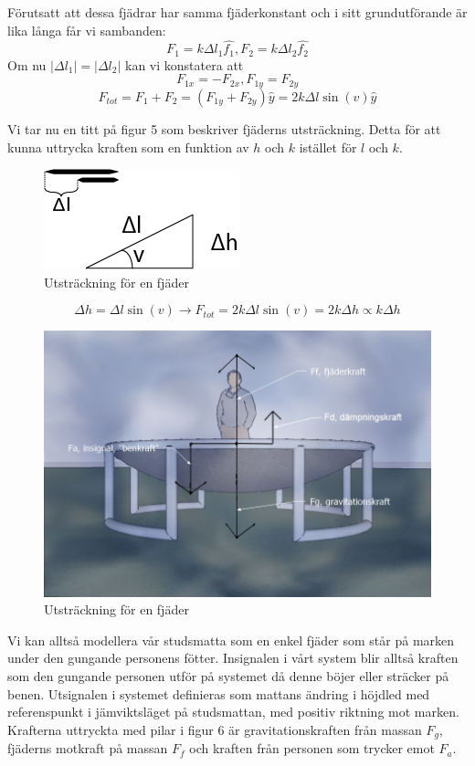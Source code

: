 \documentclass[10pt,a4paper]{article}
\begin{document}
Förutsatt att dessa fjädrar har samma fjäderkonstant och i sitt grundutförande är lika långa får vi sambanden:
$$F_1=k\Delta l_1\hat{f_1}, F_2=k\Delta l_2\hat{f_2}$$
Om nu $|\Delta l_1|=|\Delta l_2|$ kan vi konstatera att
$$F_{1x}=-F_{2x}, F_{1y}=F_{2y}$$
$$F_{tot}=F_1+F_2=(F_{1y}+F_{2y})\hat{y}=2k\Delta l\sin(v)\hat{y}$$

\pagebreak
Vi tar nu en titt på figur 5 som beskriver fjäderns utsträckning. Detta för att kunna uttrycka kraften som en funktion av $h$ och $k$ istället för $l$ och $k$.

\begin{figure}[ht]
\begin{center}
\includegraphics[scale=0.5]{utstrackning}
\caption{Utsträckning för en fjäder}
\end{center}
\end{figure}

$$\Delta h = \Delta l \sin(v) \rightarrow F_{tot}=2k\Delta l \sin(v)=2k\Delta h\propto k\Delta h $$

\begin{figure}[ht]
\begin{center}
\includegraphics[scale=0.5]{BildKrafterMedDampning}
\caption{Utsträckning för en fjäder}
\end{center}
\end{figure}

Vi kan alltså modellera vår studsmatta som en enkel fjäder som står på marken under den gungande personens fötter.
Insignalen i vårt system blir alltså kraften som den gungande personen utför på systemet då denne böjer eller sträcker på benen. Utsignalen i systemet definieras som mattans ändring i höjdled med referenspunkt i jämviktsläget på studsmattan, med positiv riktning mot marken. 
Krafterna uttryckta med pilar i figur 6 är gravitationskraften från massan $F_g$, fjäderns motkraft på massan $F_f$ och kraften från personen som trycker emot $F_a$.
\end{document}
